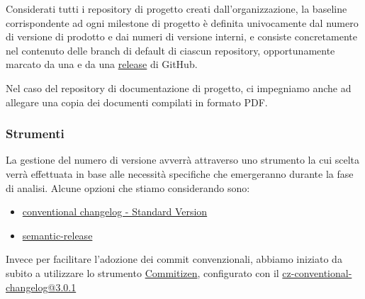 \documentclass[../../norme-di-progetto.tex]{subfiles}
\begin{document}
Considerati tutti i repository di progetto creati dall'organizzazione, la baseline corrispondente ad ogni milestone di progetto è definita univocamente dal numero di versione di prodotto e dai numeri di versione interni, e consiste concretamente nel contenuto delle branch di default di ciascun repository, opportunamente marcato da una  e da una \href{https://help.github.com/en/github/administering-a-repository/about-releases}{release} di GitHub.

Nel caso del repository di documentazione di progetto, ci impegniamo anche ad allegare una copia dei documenti compilati in formato PDF\@.


\subsubsection{Strumenti}%
\label{subs:gestione_della_configurazione/strumenti}

La gestione del numero di versione avverrà attraverso uno strumento la cui scelta verrà effettuata in base alle necessità specifiche che emergeranno durante la fase di analisi. Alcune opzioni che stiamo considerando sono:

\begin{itemize}
  \item \href{https://github.com/conventional-changelog/standard-version}{conventional changelog - Standard Version}
  \item \href{https://semantic-release.gitbook.io/semantic-release/}{semantic-release}
\end{itemize}

Invece per facilitare l'adozione dei commit convenzionali, abbiamo iniziato da subito a utilizzare lo strumento \href{https://commitizen.github.io/cz-cli/}{Commitizen}, configurato con il  \href{https://www.npmjs.com/package/cz-conventional-changelog/v/3.0.1}{cz-conventional-changelog@3.0.1}
\end{document}
